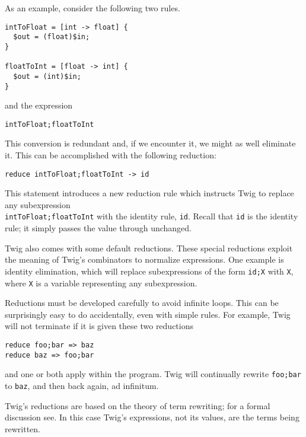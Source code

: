 As an example, consider the following two rules.

\begin{verbatim}
intToFloat = [int -> float] {
  $out = (float)$in;
}

floatToInt = [float -> int] {
  $out = (int)$in;
}
\end{verbatim}

and the expression

\begin{verbatim}
intToFloat;floatToInt
\end{verbatim}

This conversion is redundant and, if we encounter it, we might as well eliminate
it. This can be accomplished with the following reduction:

\begin{verbatim}
reduce intToFloat;floatToInt -> id
\end{verbatim}

This statement introduces a new reduction rule which instructs Twig to replace
any subexpression\\\texttt{intToFloat;floatToInt} with the identity rule,
\texttt{id}. Recall that \texttt{id} is the identity rule; it simply passes the
value through unchanged.

Twig also comes with some default reductions. These special reductions exploit
the meaning of Twig's combinators to normalize expressions. One example is
identity elimination, which will replace subexpressions of the form
\texttt{id;X} with \texttt{X}, where \texttt{X} is a variable representing any
subexpression.

Reductions must be developed carefully to avoid infinite loops. This can be
surprisingly easy to do accidentally, even with simple rules. For example, Twig
will not terminate if it is given these two reductions

\begin{verbatim}
reduce foo;bar => baz
reduce baz => foo;bar
\end{verbatim}

and one or both apply within the program. Twig will continually rewrite
\texttt{foo;bar} to \texttt{baz}, and then back again, ad infinitum.

Twig's reductions are based on the theory of term rewriting; for a formal
discussion see\cite{baader98rewriting}. In this case Twig's expressions, not
its values, are the terms being rewritten.
